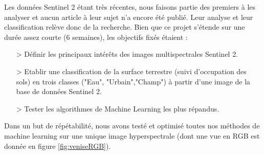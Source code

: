 Les données Sentinel 2 étant très récentes, nous faisons partie des premiers à les analyser et aucun article à leur sujet n'a encore été publié. Leur analyse et leur classification relève donc de la recherche. 
Bien que ce projet s'étende sur une durée assez courte (6 semaines), les objectifs fixés étaient :
\begin{itemize}
  \item[>] Définir les principaux intérêts des images multispectrales Sentinel 2.
  \item[>] Etablir une classification de la surface terrestre (suivi d'occupation des sols) en trois classes ("Eau", "Urbain","Champ") à partir d'une image de la base de données Sentinel 2.
  \item[>] Tester les algorithmes de Machine Learning les plus répandus.
\end{itemize}

  Dans un but de répétabilité, nous avons testé et optimisé toutes nos méthodes de machine learning sur une unique image hyperspectrale (dont une vue en RGB est donnée en figure \ref{fig:veniseRGB}).
 
